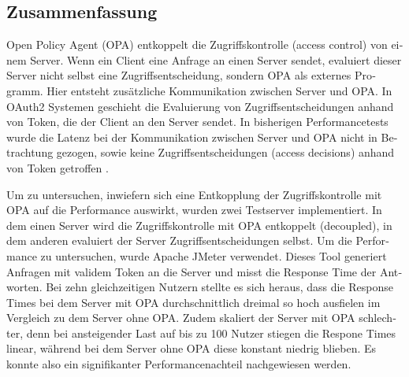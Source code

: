\begin{otherlanguage}{ngerman}
	\chapter*{Zusammenfassung}
	Open Policy Agent (OPA) entkoppelt die Zugriffskontrolle (access control) von einem Server. Wenn ein Client eine Anfrage an einen Server sendet, evaluiert dieser Server nicht selbst eine Zugriffsentscheidung, sondern OPA als externes Programm. Hier entsteht zusätzliche Kommunikation zwischen Server und OPA. In OAuth2 Systemen geschieht die Evaluierung von Zugriffsentscheidungen anhand von Token, die der Client an den Server sendet. In bisherigen Performancetests wurde die Latenz bei der Kommunikation zwischen Server und OPA nicht in Betrachtung gezogen, sowie keine Zugriffsentscheidungen (access decisions) anhand von Token getroffen \citep{opaperformance:2021:07}.\smallskip

	Um zu untersuchen, inwiefern sich eine Entkopplung der Zugriffskontrolle mit OPA auf die Performance auswirkt, wurden zwei Testserver implementiert. In dem einen Server wird die Zugriffskontrolle mit OPA entkoppelt (decoupled), in dem anderen evaluiert der Server Zugriffsentscheidungen selbst. Um die Performance zu untersuchen, wurde Apache JMeter verwendet. Dieses Tool generiert Anfragen mit validem Token an die Server und misst die Response Time der Antworten. Bei zehn gleichzeitigen Nutzern stellte es sich heraus, dass die Response Times bei dem Server mit OPA durchschnittlich dreimal so hoch ausfielen im Vergleich zu dem Server ohne OPA. Zudem skaliert der Server mit OPA schlechter, denn bei ansteigender Last auf bis zu 100 Nutzer stiegen die Respone Times linear, während bei dem Server ohne OPA diese konstant niedrig blieben. Es konnte also ein signifikanter Performancenachteil nachgewiesen werden. 
	

\end{otherlanguage}

